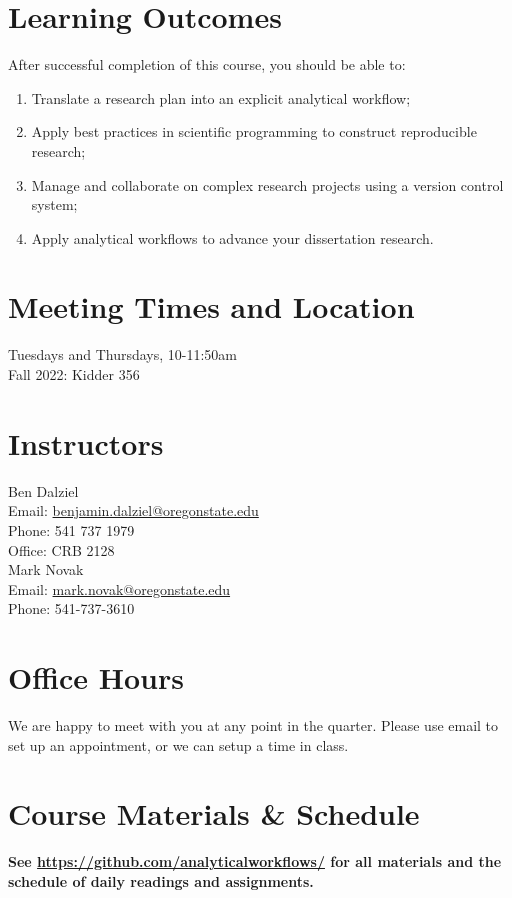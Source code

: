 \documentclass[10pt]{article}
\begin{document}
\section*{Learning Outcomes}
\noindent
After successful completion of this course, you should be able to:
\begin{enumerate}
	\itemsep0em
	\item Translate a research plan into an explicit analytical workflow;
	\item Apply best practices in scientific programming to construct reproducible research;
	\item Manage and collaborate on complex research projects using a version control system;
	\item Apply analytical workflows to advance your dissertation research.
\end{enumerate}

\section*{Meeting Times and Location}
\noindent
	Tuesdays and Thursdays, 10-11:50am\\
	Fall 2022: Kidder 356

\section*{Instructors}
\noindent
	Ben Dalziel\\
	Email: \href{mailto:benjamin.dalziel@oregonstate.edu}{benjamin.dalziel@oregonstate.edu}\\
	Phone: 541 737 1979\\
	Office: CRB 2128\\

	\noindent
	Mark Novak\\
	Email: \href{mailto:mark.novak@oregonstate.edu}{mark.novak@oregonstate.edu}\\
	Phone: 541-737-3610\\

\section*{Office Hours}
\noindent
	We are happy to meet with you at any point in the quarter. Please use email to set up an appointment, or we can setup a time in class.

	\clearpage
\section*{Course Materials \& Schedule}
\noindent
\begin{center}
\textbf{See
\href{https://github.com/analyticalworkflows}{https://github.com/analyticalworkflows/}
 for all materials and the schedule of daily readings and assignments.}
\end{center}
\end{document}
